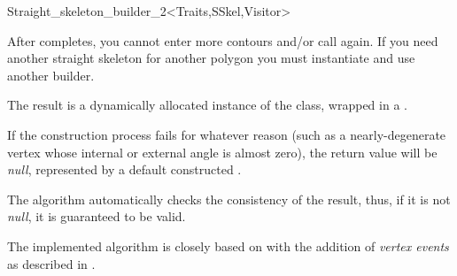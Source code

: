 \begin{ccRefClass}{Straight_skeleton_builder_2<Traits,SSkel,Visitor>}
{After  completes, you cannot enter more contours and/or call  again. If you need another straight skeleton for another polygon you must instantiate and use another builder.

The result is a dynamically allocated instance of the  class, wrapped in a .

If the construction process fails for whatever reason (such as a nearly-degenerate vertex whose internal or external angle is almost zero), the return value will be {\em null}, represented by a default constructed .

The algorithm automatically checks the consistency of the result, thus, if it is not {\em null}, it is guaranteed to be valid.
}




The implemented algorithm is closely based on \cite{cgal:fo-ss-98} with the addition of \textit{vertex events} as described in \cite{cgal:ee-rrccpp-98}.


\end{ccRefClass}
